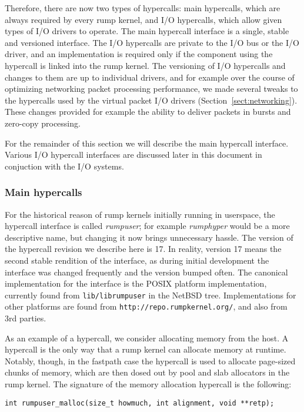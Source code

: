 Therefore, there are now two types of hypercalls: main hypercalls,
which are always required by every rump kernel, and I/O hypercalls,
which allow given types of I/O drivers to operate.  The main hypercall
interface is a single, stable and versioned interface.  The I/O hypercalls
are private to the I/O bus or the I/O driver, and an implementation is
required only if the component using the hypercall is linked into the
rump kernel.  The versioning of I/O hypercalls and changes to them are
up to individual drivers, and for example over the course of optimizing
networking packet processing performance, we made several tweaks to the
hypercalls used by the virtual packet I/O drivers
(Section~\ref{sect:networking}).  These changes provided for example
the ability to deliver packets in bursts and zero-copy processing.

For the remainder of this section we will describe the main hypercall
interface.  Various I/O hypercall interfaces are discussed later in this
document in conjuction with the I/O systems.


\subsubsection*{Main hypercalls}

For the historical reason of rump kernels initially running in userspace,
the hypercall interface is called \textit{rumpuser}; for example
\textit{rumphyper} would be a more descriptive name, but changing it
now brings unnecessary hassle.  The version of the hypercall revision
we describe here is 17.  In reality, version 17 means the second stable
rendition of the interface, as during initial development the interface
was changed frequently and the version bumped often.  The canonical
implementation for the interface is the POSIX platform
implementation, currently found from \texttt{lib/librumpuser} in
the NetBSD tree.  Implementations for other platforms are found from
\texttt{http://repo.rumpkernel.org/}, and also from 3rd parties.

As an example of a hypercall, we consider allocating memory from the host.
A hypercall is the only way that a rump kernel can allocate memory at
runtime.  Notably, though, in the fastpath case the hypercall is used
to allocate page-sized chunks of memory, which are then dosed out by
pool and slab allocators in the rump kernel.  The signature of the memory
allocation hypercall is the following:

{\small
\begin{verbatim}
int	rumpuser_malloc(size_t howmuch, int alignment, void **retp);
\end{verbatim}}

